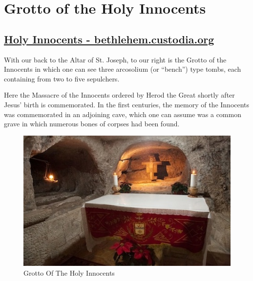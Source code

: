 \documentclass[letterpaper]{report}
\begin{document}
\section{Grotto of the Holy Innocents}
\begin{multicols}{2}

\subsection{\href{http://www.bethlehem.custodia.org/default.asp?id=473}{
Holy Innocents - bethlehem.custodia.org}}

With our back to the Altar of St. Joseph,
to our right is the Grotto of the Innocents in which one can see three 
arcosolium (or “bench”) type tombs,
each containing from two to five sepulchers.

Here the Massacre of the Innocents ordered by Herod the Great shortly after 
Jesus’ birth is commemorated.
In the first centuries, the memory of the Innocents was commemorated in an
adjoining cave,
which one can assume was a common grave in which numerous bones of corpses had 
been found.

\begin{figure}[H]
\centering
\label{fig:GrottoOfTheInnocents}
\caption{Grotto Of The Holy Innocents}
\includegraphics[width=\columnwidth]{GrottoOfTheInnocents}
\end{figure}

\end{multicols}
\end{document}

